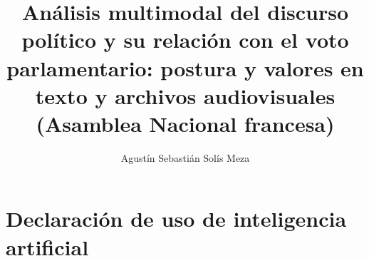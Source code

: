 \documentclass{umemoria}
\author{Agustín Sebastián Solís Meza}
\title{Análisis multimodal del discurso político y su relación con el voto parlamentario: postura y valores en texto y archivos audiovisuales (Asamblea Nacional francesa)}
\begin{document}
\frontmatter
\maketitle

\begin{resumen}
\end{resumen}


\tableofcontents
\listoftables
\listoffigures

\chapter*{Declaración de uso de inteligencia artificial}

\mainmatter









\nocite{*} %


\end{document}
